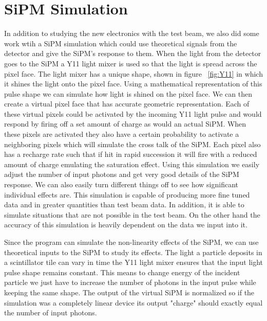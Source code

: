\section{SiPM Simulation}

In addition to studying the new electronics with the test beam, we also did some work wtih a SiPM simulation which could use theoretical signals from the detector and give the SiPM's response to them. When the light from the detector goes to the SiPM a Y11 light mixer is used so that the light is spread across the pixel face. The light mixer has a unique shape, shown in figure ~\ref{fig:Y11} in which it shines the light onto the pixel face. Using a mathematical representation of this pulse shape we can simulate how light is shined on the pixel face. We can then create a virtual pixel face that has accurate geometric representation. Each of these virtual pixels could be activated by the incoming Y11 light pulse and would respond by firing off a set amount of charge as would an actual SiPM. When these pixels are activated they also have a certain probability to activate a neighboring pixels which will simulate the cross talk of the SiPM. Each pixel also has a recharge rate such that if hit in rapid succession it will fire with a reduced amount of charge emulating the saturation effect. Using this simulation we easily adjust the number of input photons and get very good details of the SiPM response. We can also easily turn different things off to see how significant individual effects are. This simulation is capable of producing more fine tuned data and in greater quantities than test beam data. In addition, it is able to simulate situations that are not possible in the test beam. On the other hand the accuracy of this simulation is heavily dependent on the data we input into it.

Since the program can simulate the non-linearity effects of the SiPM, we can use theoretical inputs to the SiPM to study its effects. The light a particle deposits in a scintillator tile can vary in time the Y11 light mixer ensures that the input light pulse shape remains constant. This means to change energy of the incident particle we just have to increase the number of photons in the input pulse while keeping the same shape. The output of the virtual SiPM is normalized so if the simulation was a completely linear device its output "charge" should exactly equal the number of input photons. 

